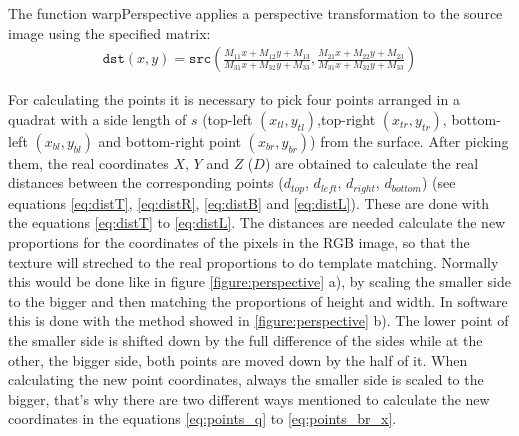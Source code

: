 The function warpPerspective applies a perspective transformation to the source image using the specified matrix:
\begin{gather}
\texttt{dst} (x,y) = \texttt{src} \left ( \frac{M_{11} x + M_{12} y + M_{13}}{M_{31} x + M_{32} y + M_{33}} , \frac{M_{21} x + M_{22} y + M_{23}}{M_{31} x + M_{32} y + M_{33}} \right ) 
\end{gather}
\cite{willowgarage:opencv:warpPerspective}

For calculating the points it is necessary to pick four points arranged in a quadrat with a side length of $s$
(top-left $(x_{tl},y_{tl})$,top-right $(x_{tr},y_{tr})$, bottom-left $(x_{bl},y_{bl})$  and bottom-right point $(x_{br},y_{br})$) 
from the surface. 
After picking them, the real coordinates $X$, $Y$ and $Z$ ($D$) are obtained to calculate 
the real distances between the corresponding points ($d_{top}$, $d_{left}$, $d_{right}$, $d_{bottom}$)
(see equations \ref{eq:distT}, \ref{eq:distR}, \ref{eq:distB} and \vref{eq:distL}).
These are done with the equations \vref{eq:distT} to \vref{eq:distL}.
The distances are needed calculate the new proportions for the coordinates of the pixels in the RGB image, so that
the texture will streched to the real proportions to do template matching. Normally this would be done like in
figure \vref{figure:perspective} a), by scaling the smaller side to the bigger and then matching the proportions
of height and width. In software this is done with the method showed in \vref{figure:perspective} b). 
The lower point of the smaller side is shifted down by the full difference of the sides while at the other, 
the bigger side, both points are moved down by the half of it. When calculating the new point coordinates,
always the smaller side is scaled to the bigger, that's why there are two different ways mentioned to 
calculate the new coordinates in the equations \ref{eq:points_q} to \vref{eq:points_br_x}.



